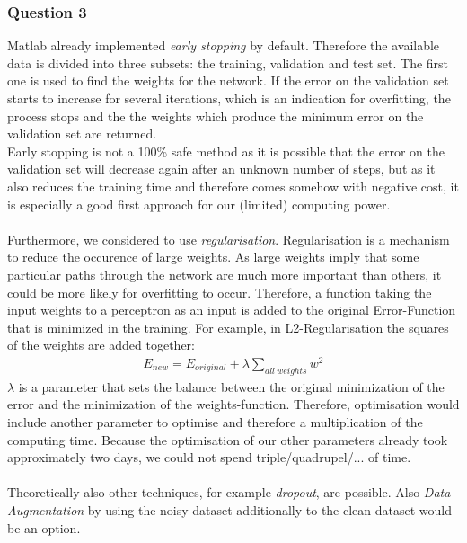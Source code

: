 \documentclass{article}
\begin{document}
\subsubsection*{Question 3}
Matlab already implemented \emph{early stopping} by default. Therefore the available data is divided into three subsets: the training, validation and test set. The first one is used to find the weights for the network. If the error on the validation set starts to increase for several iterations, which is an indication for overfitting, the process stops and the the weights which produce the minimum error on the validation set are returned.\\
Early stopping is not a 100\% safe method as it is possible that the error on the validation set will decrease again after an unknown number of steps, but as it also reduces the training time and therefore comes somehow with negative cost, it is especially a good first approach for our (limited) computing power.\\
\\
Furthermore, we considered to use \emph{regularisation}. Regularisation is a mechanism to reduce the occurence of large weights. As large weights imply that some particular paths through the network are much more important than others, it could be more likely for overfitting to occur. Therefore, a function taking the input weights to a perceptron as an input is added to the original Error-Function that is minimized in the training. For example, in L2-Regularisation the squares of the weights are added together:
\begin{align*}
    E_{new} = E_{original} + \lambda \sum \limits_{all\ weights} w^2
\end{align*}
$\lambda$ is a parameter that sets the balance between the original minimization of the error and the minimization of the weights-function. Therefore, optimisation would include another parameter to optimise and therefore a multiplication of the computing time. Because the optimisation of our other parameters already took approximately two days, we could not spend triple/quadrupel/... of time. \\
\\
Theoretically also other techniques, for example \emph{dropout}, are possible. Also \emph{Data Augmentation} by using the noisy dataset additionally to the clean dataset would be an option.\\
\\
\end{document}
